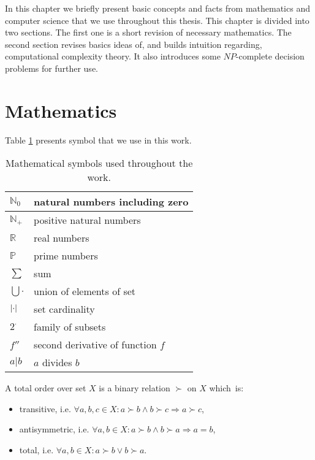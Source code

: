In this chapter we briefly present basic concepts and facts from mathematics and computer science
that we use throughout this thesis.
This chapter is divided into two sections.
The first one is a short revision of necessary mathematics.
The second section revises basics ideas of, and builds intuition regarding, computational complexity theory.
It also introduces some $NP$-complete decision problems for further use.


\section{Mathematics}

Table \ref{symbols} presents symbol that we use in this work.

\begin{table} \centering
\begin{tabular}{| l | l |} \hline
	$\mathbb{N}_0$	& natural numbers including zero \\ \hline
	$\mathbb{N}_+$	& positive natural numbers \\ \hline
	$\mathbb{R}$	& real numbers \\ \hline
	$\mathbb{P}$	& prime numbers \\ \hline
	$\sum$	& sum \\ \hline 
	$\bigcup \cdot$	& union of elements of set\\ \hline
	$\left\vert \cdot \right\vert$	& set cardinality \\ \hline
	$2^\cdot$		& family of subsets \\ \hline
	$f''$			& second derivative of function $f$ \\ \hline
  $ a | b$              & $a$ divides $b$ \\ \hline
\end{tabular}
\caption{Mathematical symbols used throughout the work.} \label{symbols}
\end{table}

\begin{defn}
A total order over set $X$ is a binary relation $\succ$ on $X$ which~is:
\begin{itemize}
	\item transitive, i.e. $\forall a,b,c \in X: a \succ b \land b \succ c \Rightarrow a \succ c$,
	\item antisymmetric, i.e. $\forall a,b \in X: a \succ b \land b \succ a \Rightarrow a=b $,
	\item total, i.e. $\forall a,b \in X: a \succ b \lor b \succ a$.
\end{itemize}
\end{defn}

